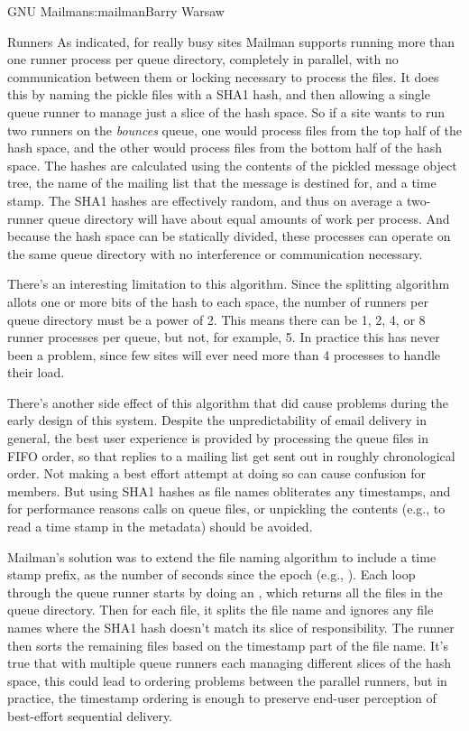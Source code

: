 \begin{aosachapter}{GNU Mailman}{s:mailman}{Barry Warsaw}
\begin{aosasect1}{Runners}
As indicated, for really busy sites Mailman supports running more
than one runner process per queue directory, completely in parallel,
with no communication between them or locking necessary to process the
files.  It does this by naming the pickle files with a SHA1 hash, and
then allowing a single queue runner to manage just a slice of the hash
space.  So if a site wants to run two runners on the \emph{bounces}
queue, one would process files from the top half of the hash space,
and the other would process files from the bottom half of the hash
space.  The hashes are calculated using the contents of the pickled
message object tree, the name of the mailing list that the message is
destined for, and a time stamp.  The SHA1 hashes are effectively
random, and thus on average a two-runner queue directory will have
about equal amounts of work per process.  And because the hash space
can be statically divided, these processes can operate on the same
queue directory with no interference or communication necessary.

There's an interesting limitation to this algorithm.  Since the
splitting algorithm allots one or more bits of the hash to each space,
the number of runners per queue directory must be a power of 2.  This
means there can be 1, 2, 4, or 8 runner processes per queue, but not,
for example, 5.  In practice this has never been a problem, since few
sites will ever need more than 4 processes to handle their load.

There's another side effect of this algorithm that did cause problems
during the early design of this system.  Despite the unpredictability
of email delivery in general, the best user experience is provided by
processing the queue files in FIFO order, so that replies to a mailing
list get sent out in roughly chronological order.  Not making a best
effort attempt at doing so can cause confusion for members.  But using
SHA1 hashes as file names obliterates any timestamps, and for
performance reasons  calls on queue files, or unpickling
the contents (e.g., to read a time stamp in the metadata) should be
avoided.

Mailman's solution was to extend the file naming algorithm to include
a time stamp prefix, as the number of seconds since the epoch (e.g.,
).  Each loop through the queue
runner starts by doing an , which returns all the
files in the queue directory. Then for each file, it splits the file
name and ignores any file names where the SHA1 hash doesn't match its
slice of responsibility.  The runner then sorts the remaining files
based on the timestamp part of the file name.  It's true that with
multiple queue runners each managing different slices of the hash
space, this could lead to ordering problems between the parallel
runners, but in practice, the timestamp ordering is enough to preserve
end-user perception of best-effort sequential delivery.


\end{aosasect1}
\end{aosachapter}
